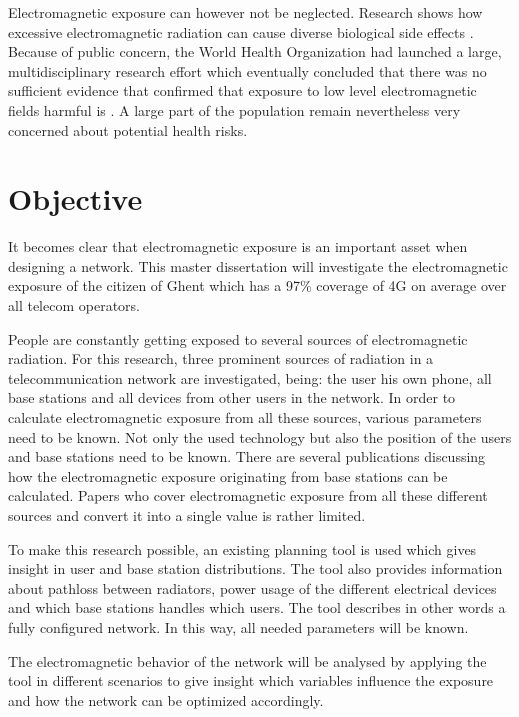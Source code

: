 Electromagnetic exposure can however not be neglected. Research shows how excessive electromagnetic radiation can cause diverse biological side effects \cite{bioeffects}.
Because of public concern, the World Health Organization had launched a large, multidisciplinary research effort which eventually concluded that there was no sufficient evidence that confirmed 
that exposure to low level electromagnetic fields harmful is \cite{WHO}. A large part of the population remain nevertheless very concerned about potential health risks.

\section{Objective}
\label{sec:objective}

It becomes clear that electromagnetic exposure is an important asset when designing a network. This master dissertation will investigate the electromagnetic 
exposure of the citizen of Ghent which has a 97\% coverage of 4G on average over all telecom operators\cite{testaankoop}.

People are constantly getting exposed to several sources of electromagnetic radiation. For this research, three prominent sources of radiation in a telecommunication
network are investigated, being: the user his own phone, all base stations and all devices from other users in the network. In order to calculate electromagnetic 
exposure from all these sources, various parameters need to be known. Not only the used technology but also the position of the users and base stations 
need to be known. There are several publications discussing how the electromagnetic exposure originating from base stations can be calculated. 
Papers who cover electromagnetic exposure from all these different sources and convert it into a single value is rather limited.

To make this research possible, an existing planning tool is used which gives insight in user and base station distributions.
The tool also provides information about pathloss between radiators, power usage of 
the different electrical devices and which base stations handles which users. The tool describes in other words a fully configured network.
In this way, all needed parameters will be known.

The electromagnetic behavior of the network will be analysed by applying the tool in different scenarios to give insight which variables influence the exposure and how
the network can be optimized accordingly. 

